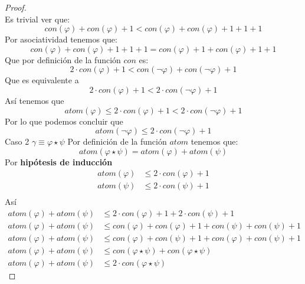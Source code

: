 \documentclass[a4paper]{article}
\begin{document}
\begin{proof}
\[    \]
    Es trivial ver que:
    \[
        con\left(\varphi\right) + con\left(\varphi\right) + 1 < con\left(\varphi\right) +  con\left(\varphi\right) + 1 + 1 + 1
    \]
    Por asociatividad tenemos que:
    \[
        con\left(\varphi\right) + con\left(\varphi\right) + 1 + 1 + 1 = con\left(\varphi\right) + 1 + con\left(\varphi\right) + 1 + 1
    \]
    Que por definición de la función \(con\) es:
    \[
        2 \cdot con\left(\varphi\right) + 1 < con\left(\neg \varphi\right) + con\left(\neg \varphi\right) + 1
    \]
    Que es equivalente a 
    \[
        2 \cdot con\left(\varphi\right) + 1 < 2 \cdot con\left(\neg \varphi\right) + 1
    \]
    Así tenemos que
    \[
        atom\left(\varphi\right) \leq 2 \cdot con\left(\varphi\right) + 1 < 2 \cdot con\left(\neg \varphi\right) + 1
    \]
    Por lo que podemos concluir que
    \[
        atom\left(\neg \varphi\right) \leq 2 \cdot con\left(\neg \varphi\right) + 1
    \]
    Caso 2
    \newline 
    \(\gamma \equiv \varphi \star \psi\)
    \newline
    Por definición de la función \(atom\) tenemos que:
    \[
        atom\left(\varphi \star \psi\right) = atom\left(\varphi\right) + atom\left(\psi\right) 
    \]
    Por \textbf{hipótesis de inducción}
    \begin{align*}
        atom\left(\varphi\right)  &\leq 2 \cdot con\left(\varphi\right) + 1 \\
        atom\left(\psi\right)  &\leq 2 \cdot con\left(\psi\right) + 1 \\
    \end{align*}
    Así
    \begin{align*}
        atom\left(\varphi\right) + atom\left(\psi\right) &\leq 2 \cdot con\left(\varphi\right) + 1 + 2 \cdot con\left(\psi\right) + 1 \\
        atom\left(\varphi\right) + atom\left(\psi\right) &\leq con\left(\varphi\right) + con\left(\varphi\right) + 1 + con\left(\psi\right) + con\left(\psi\right) + 1 \\
        atom\left(\varphi\right) + atom\left(\psi\right) &\leq con\left(\varphi\right) + con\left(\psi\right) + 1 + con\left(\varphi\right) + con\left(\psi\right) + 1 \\
        atom\left(\varphi\right) + atom\left(\psi\right) &\leq con\left(\varphi \star \psi\right) + con\left(\varphi \star \psi\right) \\
        atom\left(\varphi\right) + atom\left(\psi\right) &\leq 2 \cdot con\left(\varphi \star \psi\right)

\end{align*}
\end{proof}
\end{document}
